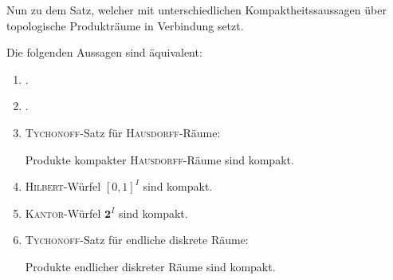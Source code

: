 Nun zu dem Satz, welcher \PIT mit unterschiedlichen Kompaktheitssaussagen über topologische Produkträume in Verbindung setzt.

\begin{thm}
  \label{thm:pitequivalence}
  Die folgenden Aussagen sind äquivalent:
  \begin{enumerate}[(1)]
    \item \PIT.
    \item \UFT.
    \item \textsc{Tychonoff}-Satz für \textsc{Hausdorff}-Räume: 
      \begin{addmargin}[2em]{2em}%
        Produkte kompakter \textsc{Hausdorff}-Räume sind kompakt.
      \end{addmargin}
    \item \textsc{Hilbert}-Würfel $[0,1]^I$ sind kompakt.
    \item \textsc{Kantor}-Würfel $\mathbf{2}^I$ sind kompakt.
    \item \textsc{Tychonoff}-Satz für endliche diskrete Räume: 
      \begin{addmargin}[2em]{2em}%
        Produkte endlicher diskreter Räume sind kompakt.
      \end{addmargin}
  \end{enumerate}
\end{thm}

